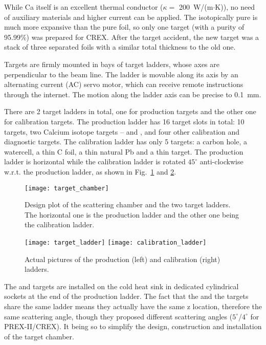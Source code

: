 While Ca itself is an excellent thermal conductor ($\kappa =$ 200~W/(m$\cdot$K)), 
no need of auxiliary materials and higher current can be applied. 
The isotopically pure \Ca is much more expansive than the pure \Pb foil, so only 
one \Ca target (with a purity of 95.99\%) was prepared for CREX.
After the target accident, 
the new \Ca target was a stack of three separated foils with a similar total thickness
to the old one.

Targets are firmly mounted in bays of target ladders, whose axes are 
perpendicular to the beam line. The ladder is movable along its axis by an 
alternating current (AC) servo motor, which can receive remote instructions 
through the internet. The motion along the ladder axis can be precise to 0.1~mm.

There are 2 target ladders in total, one for production targets and the other
one for calibration targets. The production ladder has 16 target slots in total:
10 \Pb targets, two Calcium isotope targets -- \ca and \Ca, and four other 
calibration and diagnostic targets. The calibration ladder has only 5 targets:
a carbon hole, a watercell, a thin C foil, a thin natural Pb and a thin \ca target.
The production ladder is horizontal while the calibration ladder is rotated 
$45^\circ$ anti-clockwise w.r.t. the production ladder, 
as shown in Fig.~\ref{fig:scattering_chamber} and \ref{fig:target_ladder}.

\begin{figure}[!h]
    \centering
    \texttt{[image: target\_chamber]}
    \caption{Design plot of the scattering chamber and the two target ladders.
    The horizontal one is the production ladder and the other one being the 
    calibration ladder.}
    \label{fig:scattering_chamber}
\end{figure}
\begin{figure}[!h]
    \centering
    \texttt{[image: target\_ladder]}
    \texttt{[image: calibration\_ladder]}
    \caption{Actual pictures of the production (left) and calibration (right) ladders.}
    \label{fig:target_ladder}
\end{figure}

The \ca and \Ca targets are installed on the cold heat sink in dedicated cylindrical 
sockets at the end of the production ladder. %
The fact that the \Ca and the \Pb targets share the same ladder means they 
actually have the same z location, therefore the same scattering angle,
though they proposed different scattering angles ($5^\circ$/$4^\circ$ for PREX-II/CREX).
It being so to simplify the design, construction and installation of the target chamber.


